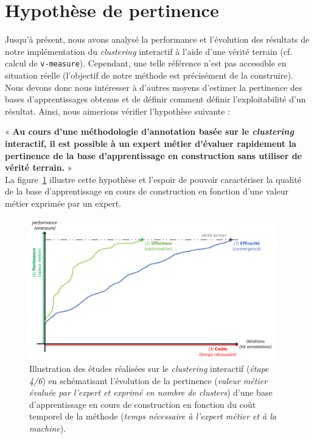 \section{Hypothèse de pertinence}
\label{section:4.4-HYPOTHESE-PERTINENCE}

	Jusqu'à présent, nous avons analysé la performance et l'évolution des résultats de notre implémentation du \textit{clustering} interactif à l'aide d'une vérité terrain (cf. calcul de \texttt{v-measure}).
	Cependant, une telle référence n'est pas accessible en situation réelle (l'objectif de notre méthode est précisément de la construire).
	Nous devons donc nous intéresser à d'autres moyens d'estimer la pertinence des bases d'apprentissages obtenus et de définir comment définir l'exploitabilité d'un résultat.
	Ainsi, nous aimerions vérifier l'hypothèse suivante :
	
	\begin{tcolorbox}[
		title=\faVial~\textbf{Hypothèse de pertinence}~\faVial,
		colback=colorTcolorboxHypothesis!15,
		colframe=colorTcolorboxHypothesis!75,
		width=\linewidth
	]
		« \textbf{
			Au cours d'une méthodologie d'annotation basée sur le \textit{clustering} interactif, il est possible à un expert métier d'évaluer rapidement la pertinence de la base d'apprentissage en construction sans utiliser de vérité terrain.
		} » \\
		
		La figure~\ref{figure:4.4-HYPOTHESE-PERTINENCE} illustre cette hypothèse et l'espoir de pouvoir caractériser la qualité de la base d'apprentissage en cours de construction en fonction d'une valeur métier exprimée par un expert.
		\begin{figure}[H]  %
			\centering
			\includegraphics[width=0.95\textwidth]{figures/hypotheses-04-pertinence}
			\caption{Illustration des études réalisées sur le \textit{clustering} interactif (\textit{étape 4/6}) en schématisant l'évolution de la pertinence (\textit{valeur métier évaluée par l'expert et exprimé en nombre de clusters}) d'une base d'apprentissage en cours de construction en fonction du coût temporel de la méthode (\textit{temps nécessaire à l'expert métier et à la machine}).}
			\label{figure:4.4-HYPOTHESE-PERTINENCE}
		\end{figure}

	\end{tcolorbox}
		
